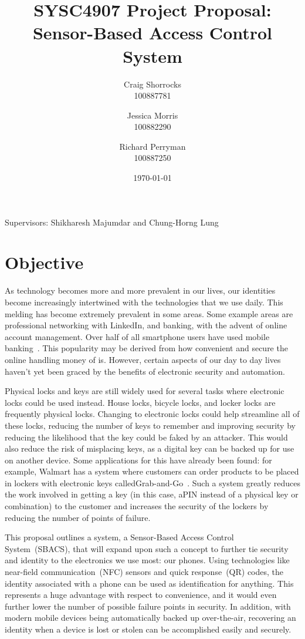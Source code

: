 \documentclass{article}
\title{SYSC4907 Project Proposal: \\ Sensor-Based Access Control System}
\author{
	Craig Shorrocks \\
	100887781
	\and
	Jessica Morris \\
	100882290
	\and
	Richard Perryman \\
	100887250
}
\date{\today}
\begin{document}
\maketitle

\begin{center}
Supervisors: Shikharesh Majumdar and Chung-Horng Lung
\end{center}

\pagebreak

\tableofcontents

\pagebreak

\section{Objective}

As technology becomes more and more prevalent in our lives, our identities become increasingly intertwined with the
technologies that we use daily. This melding has become extremely prevalent in some areas. Some example areas are
professional networking with LinkedIn, and banking, with the advent of online account management. Over half of all
smartphone users have used mobile banking~\autocite{MOBILEBANKING}. This popularity may be derived
from how convenient and secure the online handling money of is. However, certain aspects of our day to day lives
haven't yet been graced by the benefits of electronic security and automation.

Physical locks and keys are still widely used for several tasks where electronic locks could be used instead. House
locks, bicycle locks, and locker locks are frequently physical locks. Changing to electronic locks could help streamline
all of these locks, reducing the number of keys to remember and improving security by reducing the likelihood that the
key could be faked by an attacker. This would also reduce the risk of misplacing keys, as a digital key can be backed 
up for use on another device. Some applications for this have already been found: for example, Walmart has a system 
where customers can order products to be placed in lockers with electronic keys calledGrab-and-Go~\autocite{WALMART}. 
Such a system greatly reduces the work involved in getting a key (in this case, aPIN instead of a physical key or 
combination) to the customer and increases the security of the lockers by reducing the number of points of failure.

This proposal outlines a system, a Sensor-Based Access Control System~(SBACS), that will expand upon such a concept to 
further tie security and identity to the electronics we use most: our phones. Using technologies like near-field 
communication~(NFC) sensors and quick response~(QR) codes, the identity associated with a phone can be used as 
identification for anything. This represents a huge advantage with respect to convenience, and it would even further 
lower the number of possible failure points in security. In addition, with modern mobile devices being automatically 
backed up over-the-air, recovering an identity when a device is lost or stolen can be accomplished easily and securely.
\end{document}

